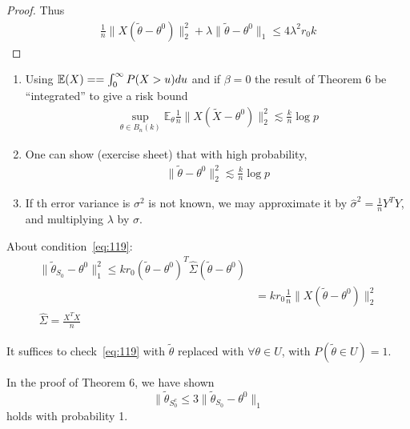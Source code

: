 \begin{proof}
  Thus
  \begin{align}
    \label{eq:133}
    \frac{1}{n} \| X(\tilde \theta - \theta^{0}) \|_{2}^{2} + \lambda
    \| \tilde \theta - \theta^{0} \|_{1} \leq 4 \lambda^{2} r_{0} k
  \end{align}
\end{proof}

\begin{remark}
  \begin{enumerate}
  \item Using $\E{X} = = \int_{0}^{\infty}P(X > u) du$ and if $\beta =
    0$ the result of Theorem 6 be ``integrated'' to give a risk bound
    \begin{align}
      \label{eq:134}
      \sup_{\theta \in B_{n}(k)} \mathbb{E}_{\theta} \frac{1}{n} \|
      X(\tilde X - \theta^{0}) \|_{2}^{2} \lesssim \frac{k}{n} \log p
    \end{align}
  \item One can show (exercise sheet) that with high probability,
    \begin{align}
      \label{eq:135}
      \| \tilde \theta - \theta^{0} \|_{2}^{2} \lesssim \frac{k}{n}
      \log p
    \end{align}
  \item If th error variance is $\sigma^{2}$ is not known, we may
    approximate it by $\hat \sigma^{2} = \frac{1}{n} Y^{T} Y$, and
    multiplying $\lambda$ by $\hat \sigma$.
  \end{enumerate}
\end{remark}

About condition~\eqref{eq:119}:
\begin{align}
  \label{eq:137}
  \| \tilde \theta_{S_{0}} - \theta^{0} \|_{1}^{2} \leq k r_{0}
  (\tilde \theta - \theta^{0})^{T} \hat \Sigma (\tilde \theta -
  \theta^{0}) \\
  &= k r_{0} \frac{1}{n} \| X(\tilde \theta - \theta^{0}) \|_{2}^{2} \\
  \hat \Sigma = \frac{X^{T} X}{n}
\end{align}

It suffices to check~\eqref{eq:119} with $\tilde \theta$ replaced with
$\forall \theta \in U$, with $P(\tilde \theta \in U) = 1$.

In the proof of Theorem 6, we have shown
\begin{equation}
  \label{eq:138}
  \| \tilde \theta_{S_{0}^{c}} \leq 3 \| \tilde \theta_{S_{0}} -
  \theta^{0} \|_{1}
\end{equation} holds with probability 1.

